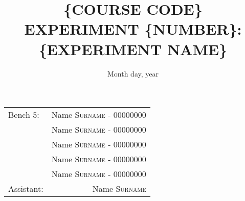 \documentclass[11pt]{article}
\title{\{COURSE CODE\} \\ EXPERIMENT \{NUMBER\}: \\ \{EXPERIMENT NAME\}}
\date{Month day, year}
\author{}
\begin{document}
\maketitle

\begin{center}
    \begin{tabular}{lr}
        Bench 5: & Name \textsc{Surname} - 00000000 \\
                 & Name \textsc{Surname} - 00000000 \\
                 & Name \textsc{Surname} - 00000000 \\
                 & Name \textsc{Surname} - 00000000 \\
                 & Name \textsc{Surname} - 00000000 \\
        \vspace{7pt}
        Assistant: & Name \textsc{Surname}
    \end{tabular}
\end{center}
\vspace{15pt}









\newpage

\end{document}
